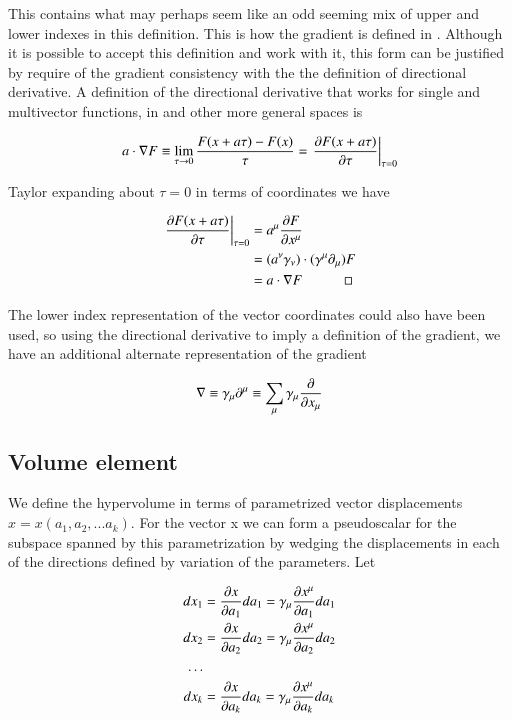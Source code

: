 This contains what may perhaps seem like an odd seeming mix of upper and lower indexes in this definition.  This is how the gradient is defined in \cite{doran2003gap}.  Although it is possible to accept this definition and work with it, this form can be justified by require of the gradient consistency with the the definition of directional derivative.  A definition of the directional derivative that works for single and multivector functions, in  and other more general spaces is

\begin{align}
a \cdot \grad F \equiv \lim_{\tau \rightarrow 0} \frac{F(x + a\tau) - F(x)}{\tau} = {\left.\PD{\tau}{F(x + a\tau)} \right\vert}_{\tau=0}
\end{align}

Taylor expanding about $\tau=0$ in terms of coordinates we have

\begin{align*}
{\left.\PD{\tau}{F(x + a\tau)} \right\vert}_{\tau=0}
&= a^\mu \PD{x^\mu}{F} \\
&= (a^\nu \gamma_\nu) \cdot (\gamma^\mu \partial_\mu) F \\
&= a \cdot \grad F \quad\quad\quad\square
\end{align*}

The lower index representation of the vector coordinates could also have been used, so using the directional derivative to imply a definition of the gradient, we have an additional alternate representation of the gradient

\begin{align}
\grad \equiv \gamma_\mu \partial^\mu \equiv \sum_\mu \gamma_\mu \PD{x_\mu}{}
\end{align}

\subsection{Volume element}
We define the hypervolume in terms of parametrized vector displacements $x = x(a_1, a_2, ... a_k)$.  For the vector x we can form a pseudoscalar for the subspace spanned by this parametrization by wedging the displacements in each of the directions defined by variation of the parameters.  Let

\begin{align*}
dx_1 & = \PD{a_1}{x} da_1 = \gamma_\mu \PD{a_1}{x^\mu} da_1 \\
dx_2 & = \PD{a_2}{x} da_2 = \gamma_\mu \PD{a_2}{x^\mu} da_2 \\
\hdots \\
dx_k & = \PD{a_k}{x} da_k = \gamma_\mu \PD{a_k}{x^\mu} da_k \\
\end{align*}

